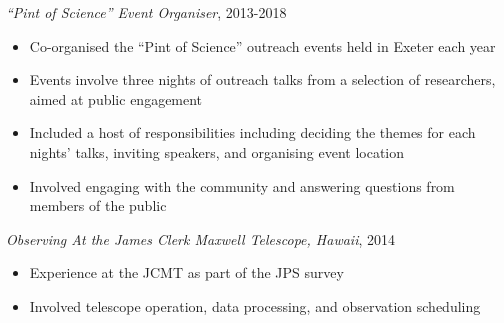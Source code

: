 \documentclass[letter, margin, 10pt]{res} %
\begin{document}
\begin{resume}
{\sl ``Pint of Science'' Event Organiser}, 2013-2018
\begin{itemize}[noitemsep,topsep=0pt,parsep=0pt,partopsep=0pt]
\item Co-organised the ``Pint of Science'' outreach events held in Exeter each year
\item Events involve three nights of outreach talks from a selection of researchers, aimed at public engagement
\item Included a host of responsibilities including deciding the themes for each nights' talks, inviting speakers, and organising event location
\item Involved engaging with the community and answering questions from members of the public
\end{itemize}

\vspace{-10pt}

{\sl Observing At the James Clerk Maxwell Telescope, Hawaii}, 2014
\begin{itemize}[noitemsep,topsep=0pt,parsep=0pt,partopsep=0pt]
\item Experience at the JCMT as part of the JPS survey
\item Involved telescope operation, data processing, and observation scheduling
\end{itemize}

 





 

\end{resume}
\end{document}
